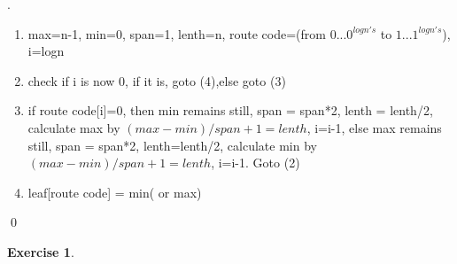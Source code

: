 \documentclass[12pt, notitlepage]{article}
\newtheorem{ex}{Exercise}
\newenvironment{sol}
  {\par\vspace{3mm}\noindent{\it Solution}.}{\qed}
\begin{document}
\begin{sol}
\begin{enumerate}[(1)]
\item max=n-1, min=0, span=1, lenth=n, route code=(from $0...0^{logn's}$ to $1...1^{logn's}$), i=logn
\item check if i is now 0, if it is, goto (4),else goto (3)
\item if route code[i]=0, then min remains still, span = span*2, lenth = lenth/2, calculate max by $(max-min)/span + 1 = lenth$, i=i-1, else max remains still, span = span*2, lenth=lenth/2, calculate min by $(max-min)/span + 1 = lenth$, i=i-1. Goto (2)
\item leaf[route code] = min( or max)
\end{enumerate}
\end{sol}


\begin{ex}\end{ex}
\end{document}
